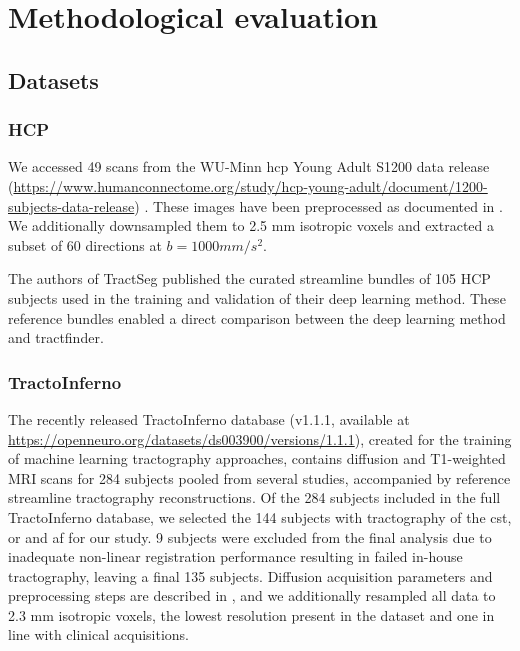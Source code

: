 \chapter{Methodological evaluation}
\label{}


\section{Datasets}
\label{sec:data}



\subsection{HCP}

We accessed 49 scans from the WU-Minn \gls{hcp} Young Adult S1200 data release (\url{https://www.humanconnectome.org/study/hcp-young-adult/document/1200-subjects-data-release}) \autocite{VanEssen2013}.
These images have been preprocessed as documented in \textcite{Glasser2013}.
We additionally downsampled them to 2.5 mm isotropic voxels and extracted a subset of 60 directions at $b=1000 mm/s^2$.

The authors of TractSeg\autocite{Wasserthal2018} published the curated streamline bundles of 105 HCP subjects used in the training and validation of their deep learning method.
These reference bundles enabled a direct comparison between the deep learning method and tractfinder.

\subsection{TractoInferno}

The recently released TractoInferno database (v1.1.1, available at \url{https://openneuro.org/datasets/ds003900/versions/1.1.1}),\autocite{Poulin2022} created for the training of machine learning tractography approaches, contains diffusion and T1-weighted MRI scans for 284 subjects pooled from several studies, accompanied by reference streamline tractography reconstructions.
Of the 284 subjects included in the full TractoInferno database, we selected the 144 subjects with tractography of the \gls{cst}, \gls{or} and \gls{af} for our study.
9 subjects were excluded from the final analysis due to inadequate non-linear registration performance resulting in failed in-house tractography, leaving a final 135 subjects.
Diffusion acquisition parameters and preprocessing steps are described in \textcite{Poulin2022}, and we additionally resampled all data to 2.3 mm isotropic voxels, the lowest resolution present in the dataset and one in line with clinical acquisitions.

